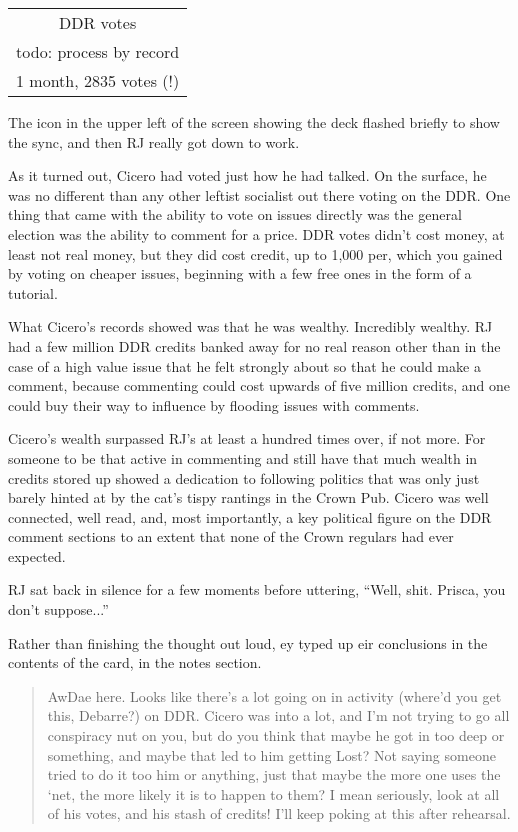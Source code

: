 \begin{tabular}{| c |}
  \hline
  DDR votes\\
  todo: process by record\\
  1 month, 2835 votes (!)\\
  \hline
\end{tabular}

The icon in the upper left of the screen showing the deck flashed briefly to show the sync, and then RJ really got down to work.

As it turned out, Cicero had voted just how he had talked.  On the surface, he was no different than any other leftist socialist out there voting on the DDR. One thing that came with the ability to vote on issues directly was the general election was the ability to comment for a price.  DDR votes didn't cost money, at least not real money, but they did cost credit, up to 1,000 per, which you gained by voting on cheaper issues, beginning with a few free ones in the form of a tutorial.

What Cicero's records showed was that he was wealthy.  Incredibly wealthy.  RJ had a few million DDR credits banked away for no real reason other than in the case of a high value issue that he felt strongly about so that he could make a comment, because commenting could cost upwards of five million credits, and one could buy their way to influence by flooding issues with comments.

Cicero's wealth surpassed RJ's at least a hundred times over, if not more.  For someone to be that active in commenting and still have that much wealth in credits stored up showed a dedication to following politics that was only just barely hinted at by the cat's tispy rantings in the Crown Pub.  Cicero was well connected, well read, and, most importantly, a key political figure on the DDR comment sections to an extent that none of the Crown regulars had ever expected.

RJ sat back in silence for a few moments before uttering, ``Well, shit.  Prisca, you don't suppose...''

Rather than finishing the thought out loud, ey typed up eir conclusions in the contents of the card, in the notes section.

\begin{quote}
  AwDae here.  Looks like there's a lot going on in activity (where'd you get this, Debarre?) on DDR.  Cicero was into a lot, and I'm not trying to go all conspiracy nut on you, but do you think that maybe he got in too deep or something, and maybe that led to him getting Lost?  Not saying someone tried to do it too him or anything, just that maybe the more one uses the `net, the more likely it is to happen to them?  I mean seriously, look at all of his votes, and his stash of credits!  I'll keep poking at this after rehearsal.
\end{quote}


